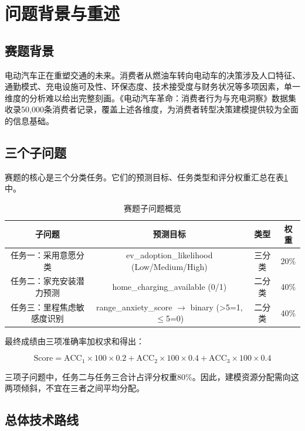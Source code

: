 \section{问题背景与重述}

\subsection{赛题背景}

电动汽车正在重塑交通的未来。消费者从燃油车转向电动车的决策涉及人口特征、通勤模式、充电设施可及性、环保态度、技术接受度与财务状况等多项因素，单一维度的分析难以给出完整刻画。《电动汽车革命：消费者行为与充电洞察》数据集收录50,000条消费者记录，覆盖上述各维度，为消费者转型决策建模提供较为全面的信息基础。

\subsection{三个子问题}

赛题的核心是三个分类任务。它们的预测目标、任务类型和评分权重汇总在表\ref{tab:tasks}中。

\begin{table}[H]
\centering
\caption{赛题子问题概览}
\label{tab:tasks}
\begin{tabular}{cccc}
\toprule
\textbf{子问题} & \textbf{预测目标} & \textbf{类型} & \textbf{权重} \\
\midrule
任务一：采用意愿分类 & ev\_adoption\_likelihood (Low/Medium/High) & 三分类 & 20\% \\
任务二：家充安装潜力预测 & home\_charging\_available (0/1) & 二分类 & 40\% \\
任务三：里程焦虑敏感度识别 & range\_anxiety\_score $\to$ binary (>5=1, $\le$5=0) & 二分类 & 40\% \\
\bottomrule
\end{tabular}
\end{table}

最终成绩由三项准确率加权求和得出：

\begin{equation}
\text{Score} = \text{ACC}_1 \times 100 \times 0.2 + \text{ACC}_2 \times 100 \times 0.4 + \text{ACC}_3 \times 100 \times 0.4
\label{eq:score}
\end{equation}

三项子问题中，任务二与任务三合计占评分权重80\%。因此，建模资源分配需向这两项倾斜，不宜在三者之间平均分配。

\subsection{总体技术路线}

